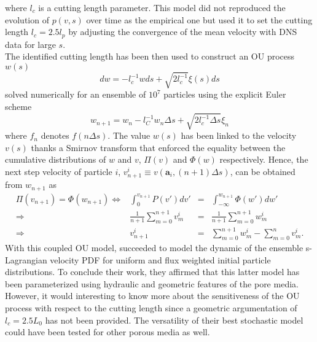 where $l_c$ is a cutting length parameter. This model did not reproduced the evolution of $p(v,s)$ over time as the empirical one but \citeauthor{Puyguiraud2019} used it to set the cutting length $l_c=2.5l_p$ by adjusting the convergence of the mean velocity with DNS data for large $s$. \\
The identified cutting length has been then used to construct an OU process $w(s)$
\[
dw = -l_c^{-1}wds + \sqrt{2l_c^{-1}}\xi(s)ds
\]
solved numerically for an ensemble of $10^7$ particles using the explicit Euler scheme 
\[
w_{n+1}=w_n-l_C^{-1}w_n\Delta s + \sqrt{2l_c^{-1}\Delta s}\xi_n
\]
where $f_n$ denotes $f(n\Delta s)$.
The value $w(s)$ has been linked to the velocity $v(s)$ thanks a Smirnov transform that enforced the equality between the cumulative distributions of $w$ and $v$, $\Pi(v)$ and $\Phi(w)$ respectively. 
Hence, the next step velocity of particle $i$, $v_{n+1}^i\equiv v(\textbf{a}_i,(n+1)\Delta s)$, can be obtained from $w_{n+1}$ as
\[
\begin{array}{rrcl}
\Pi(v_{n+1}) = \Phi(w_{n+1}) \Leftrightarrow& \int_0^{v_{n+1}} P(v')dv' &=& \int_{-\infty}^{w_{n+1}}\Phi(w')dw'\\
\Rightarrow& \frac{1}{n+1}\sum_{m=0}^{n+1}v^i_m&=&\frac{1}{n+1}\sum_{m=0}^{n+1}w^i_m\\
\Rightarrow & v^i_{n+1} &=& \sum_{m=0}^{n+1}w^i_m - \sum_{m=0}^{n}v^i_m.
\end{array}
\]
With this coupled OU model, \citeauthor{Puyguiraud2019} succeeded to model the dynamic of the ensemble s-Lagrangian velocity PDF for uniform and flux weighted initial particle distributions.
To conclude their work, they affirmed that this latter model has been parameterized using hydraulic and geometric features of the pore media. 
However, it would interesting to know more about the sensitiveness of the OU process with respect to the cutting length since a geometric argumentation of $l_c=2.5L_0$ has not been provided.
The versatility of their best stochastic model could have been tested for other porous media as well.

